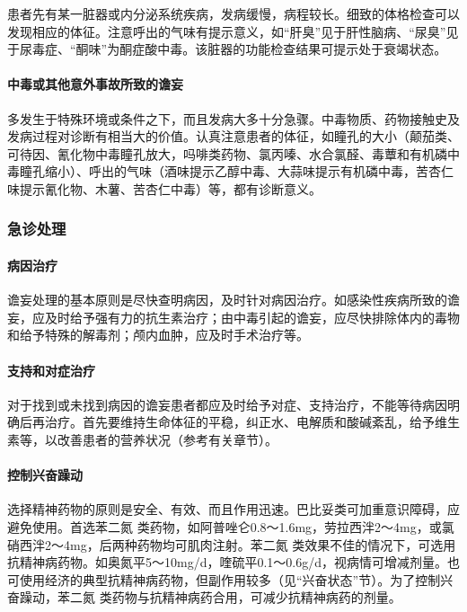 患者先有某一脏器或内分泌系统疾病，发病缓慢，病程较长。细致的体格检查可以发现相应的体征。注意呼出的气味有提示意义，如“肝臭”见于肝性脑病、“尿臭”见于尿毒症、“酮味”为酮症酸中毒。该脏器的功能检查结果可提示处于衰竭状态。

\paragraph{中毒或其他意外事故所致的谵妄}

多发生于特殊环境或条件之下，而且发病大多十分急骤。中毒物质、药物接触史及发病过程对诊断有相当大的价值。认真注意患者的体征，如瞳孔的大小（颠茄类、可待因、氰化物中毒瞳孔放大，吗啡类药物、氯丙嗪、水合氯醛、毒蕈和有机磷中毒瞳孔缩小）、呼出的气味（酒味提示乙醇中毒、大蒜味提示有机磷中毒，苦杏仁味提示氰化物、木薯、苦杏仁中毒）等，都有诊断意义。

\subsubsection{急诊处理}

\paragraph{病因治疗}

谵妄处理的基本原则是尽快查明病因，及时针对病因治疗。如感染性疾病所致的谵妄，应及时给予强有力的抗生素治疗；由中毒引起的谵妄，应尽快排除体内的毒物和给予特殊的解毒剂；颅内血肿，应及时手术治疗等。

\paragraph{支持和对症治疗}

对于找到或未找到病因的谵妄患者都应及时给予对症、支持治疗，不能等待病因明确后再治疗。首先要维持生命体征的平稳，纠正水、电解质和酸碱紊乱，给予维生素等，以改善患者的营养状况（参考有关章节）。

\paragraph{控制兴奋躁动}

选择精神药物的原则是安全、有效、而且作用迅速。巴比妥类可加重意识障碍，应避免使用。首选苯二氮{}
类药物，如阿普唑仑0.8～1.6mg，劳拉西泮2～4mg，或氯硝西泮2～4mg，后两种药物均可肌肉注射。苯二氮{}
类效果不佳的情况下，可选用抗精神病药物。如奥氮平5～10mg/d，喹硫平0.1～0.6g/d，视病情可增减剂量。也可使用经济的典型抗精神病药物，但副作用较多（见“兴奋状态”节）。为了控制兴奋躁动，苯二氮{}
类药物与抗精神病药合用，可减少抗精神病药的剂量。

